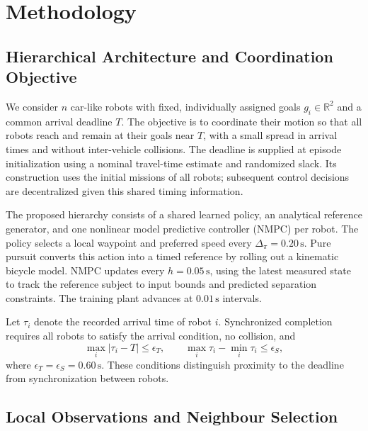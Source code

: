 
\section{Methodology}
\label{sec:methodology}

\subsection{Hierarchical Architecture and Coordination Objective}

We consider $n$ car-like robots with fixed, individually assigned goals
$g_i\in\mathbb{R}^2$ and a common arrival deadline $T$. The objective is to
coordinate their motion so that all robots reach and remain at their goals
near $T$, with a small spread in arrival times and without inter-vehicle
collisions. The deadline is supplied at episode initialization using a nominal
travel-time estimate and randomized slack. Its construction uses the initial
missions of all robots; subsequent control decisions are decentralized given
this shared timing information.

The proposed hierarchy consists of a shared learned policy, an analytical
reference generator, and one nonlinear model predictive controller (NMPC) per
robot. The policy selects a local waypoint and preferred speed every
$\Delta_\pi=0.20\,\mathrm{s}$. Pure pursuit converts this action into a timed
reference by rolling out a kinematic bicycle model. NMPC updates every
$h=0.05\,\mathrm{s}$, using the latest measured state to track the reference
subject to input bounds and predicted separation constraints. The training
plant advances at $0.01\,\mathrm{s}$ intervals.

Let $\tau_i$ denote the recorded arrival time of robot $i$. Synchronized
completion requires all robots to satisfy the arrival condition, no collision,
and
\begin{equation}
    \max_i|\tau_i-T|\leq\epsilon_T,
    \qquad
    \max_i\tau_i-\min_i\tau_i\leq\epsilon_S,
\end{equation}
where $\epsilon_T=\epsilon_S=0.60\,\mathrm{s}$. These conditions distinguish
proximity to the deadline from synchronization between robots.

\subsection{Local Observations and Neighbour Selection}

